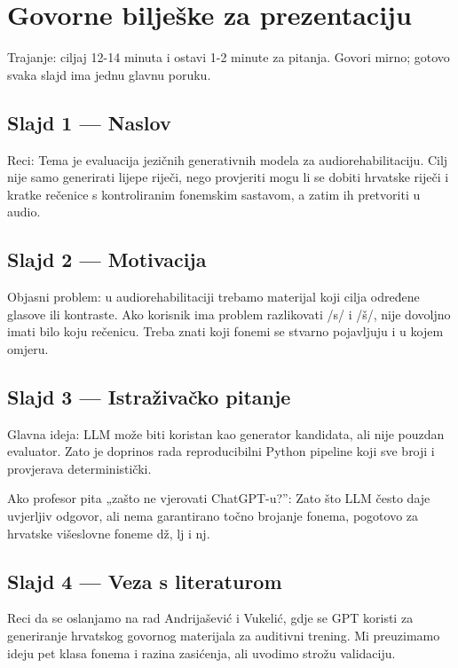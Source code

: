\documentclass[
]{article}
\author{}
\date{\vspace{-2.5em}}
\begin{document}
\section{Govorne bilješke za
prezentaciju}\label{govorne-biljeux161ke-za-prezentaciju}

Trajanje: ciljaj 12-14 minuta i ostavi 1-2 minute za pitanja. Govori
mirno; gotovo svaka slajd ima jednu glavnu poruku.

\subsection{Slajd 1 --- Naslov}\label{slajd-1-naslov}

Reci: Tema je evaluacija jezičnih generativnih modela za
audiorehabilitaciju. Cilj nije samo generirati lijepe riječi, nego
provjeriti mogu li se dobiti hrvatske riječi i kratke rečenice s
kontroliranim fonemskim sastavom, a zatim ih pretvoriti u audio.

\subsection{Slajd 2 --- Motivacija}\label{slajd-2-motivacija}

Objasni problem: u audiorehabilitaciji trebamo materijal koji cilja
određene glasove ili kontraste. Ako korisnik ima problem razlikovati /s/
i /š/, nije dovoljno imati bilo koju rečenicu. Treba znati koji fonemi
se stvarno pojavljuju i u kojem omjeru.

\subsection{Slajd 3 --- Istraživačko
pitanje}\label{slajd-3-istraux17eivaux10dko-pitanje}

Glavna ideja: LLM može biti koristan kao generator kandidata, ali nije
pouzdan evaluator. Zato je doprinos rada reproducibilni Python pipeline
koji sve broji i provjerava deterministički.

Ako profesor pita „zašto ne vjerovati ChatGPT-u?'': Zato što LLM često
daje uvjerljiv odgovor, ali nema garantirano točno brojanje fonema,
pogotovo za hrvatske višeslovne foneme dž, lj i nj.

\subsection{Slajd 4 --- Veza s
literaturom}\label{slajd-4-veza-s-literaturom}

Reci da se oslanjamo na rad Andrijašević i Vukelić, gdje se GPT koristi
za generiranje hrvatskog govornog materijala za auditivni trening. Mi
preuzimamo ideju pet klasa fonema i razina zasićenja, ali uvodimo strožu
validaciju.
\end{document}
